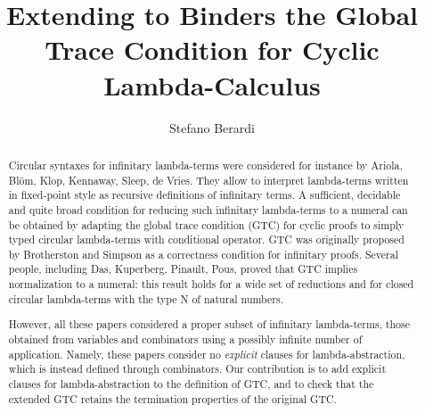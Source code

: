 \documentclass[a4paper,anonymous]{lipics-v2021}
\title{Extending to Binders the Global Trace Condition for Cyclic Lambda-Calculus}
\author
    {Stefano Berardi}
    {Computer Science Department, Turin University, Torino, Italy}
    {} %
    {0000-0001-5427-0020} %
    {} %
\begin{document}
\maketitle

\begin{abstract}
Circular syntaxes for infinitary lambda-terms
were considered for instance by Ariola, Bl\"{o}m, Klop, Kennaway, Sleep, de Vries.
They allow to interpret lambda-terms written in fixed-point style 
as recursive definitions of infinitary terms. 
A sufficient, decidable and quite broad condition for reducing such 
infinitary lambda-terms to a numeral can be obtained
by adapting the global trace condition (GTC) for cyclic proofs to simply typed 
circular lambda-terms with conditional operator. 
GTC was originally proposed by Brotherston and Simpson
as a correctness condition for infinitary proofs.
Several people, including Das, Kuperberg, Pinault, Pous,
proved that GTC implies normalization to a numeral:
this result holds for a wide set of reductions and for closed circular lambda-terms 
with the type N of natural numbers. 

However, all these papers considered a proper subset of infinitary lambda-terms, those
obtained from variables and combinators using a possibly infinite number of application.
Namely, these papers consider no \emph{explicit} clauses for lambda-abstraction,
which is instead defined through combinators.
Our contribution is to add explicit clauses for lambda-abstraction
to the definition of GTC, and to check that 
the extended GTC retains the termination properties of the original GTC. 
\end{abstract}




























\end{document}
